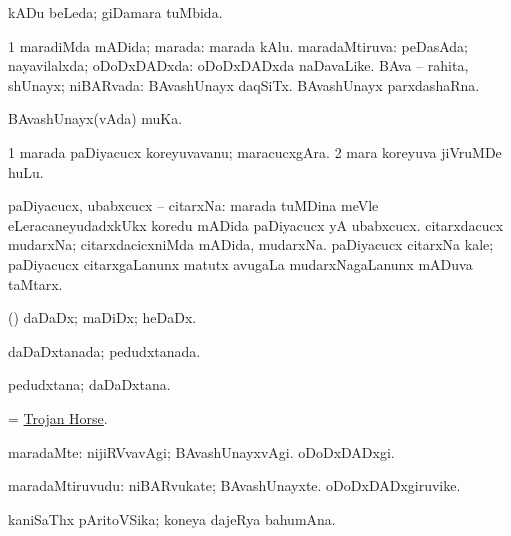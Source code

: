 \bentry
{} 
\gl{\gu}
\expl{}
\bmng
kADu beLeda; giDamara tuMbida. 
\emng
\eentry

\bentry
{} 
\gl{\gu}
\expl{}
\bmng
\bnum
\num{1} maradiMda mADida; marada:  marada kAlu. 
 maradaMtiruva: 
\banum
{} peDasAda; nayavilalxda; oDoDxDADxda:  oDoDxDADxda naDavaLike. 
 BAva -- rahita, shUnayx; niBARvada:  BAvashUnayx daqSiTx.  BAvashUnayx parxdashaRna. 
\eanum
\numie
\enum
\emng
\eentry

\bentry
{}
\gl{\nA}
\expl{}
\bmng
BAvashUnayx(vAda) muKa. 
\emng
\eentry

\bentry
{} 
\gl{\nA}
\expl{}
\bmng
\bnum
\num{1} marada paDiyacucx koreyuvavanu; maracucxgAra. 
\num{2} mara koreyuva jiVruMDe huLu. 
\enum
\emng
\eentry

\bentry
{} 
\gl{\nA}
\expl{}
\bmng
paDiyacucx, ubabxcucx -- citarxNa: 
\banum
{} marada tuMDina meVle eLeracaneyudadxkUkx koredu mADida paDiyacucx yA ubabxcucx. 
 citarxdacucx mudarxNa; citarxdacicxniMda mADida, mudarxNa. 
 paDiyacucx citarxNa kale; paDiyacucx citarxgaLanunx matutx avugaLa mudarxNagaLanunx mADuva taMtarx. 
\eanum
\emng
\eentry

\bentry
{} 
\gl{\nA}
\expl{}
\bmng
(\AmA) daDaDx; maDiDx; heDaDx. 
\emng
\eentry

\bentry
{} 
\gl{\gu}
\expl{}
\bmng
daDaDxtanada; pedudxtanada. 
\emng
\eentry

\bentry
{} 
\gl{\nA}
\expl{}
\bmng
pedudxtana; daDaDxtana. 
\emng
\eentry

\bentry
{} 
\gl{\nA}
\expl{}
\bmng
= \hyperref{kandict_t.pdf}{T}{Trojan Horse}{Trojan Horse}. 
\emng
\eentry

\bentry 
{} 
\gl{\kirxvi}
\expl{}
\bmng
maradaMte: 
\banum
{} nijiRVvavAgi; BAvashUnayxvAgi. 
 oDoDxDADxgi. 
\eanum
\emng
\eentry

\bentry
{} 
\gl{\nA}
\bmng
maradaMtiruvudu: 
\banum
{} niBARvukate; BAvashUnayxte. 
 oDoDxDADxgiruvike. 
\eanum
\emng
\eentry

\bentry
{} 
\gl{\nA}
\expl{}
\bmng
kaniSaThx pAritoVSika; koneya dajeRya bahumAna. 
\emng
\eentry

